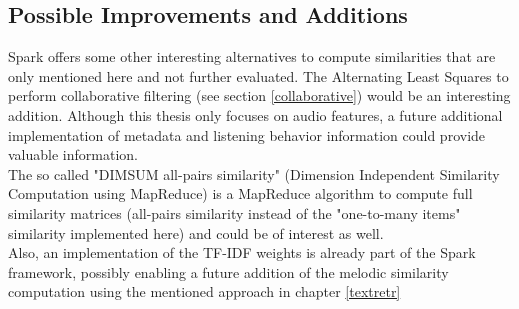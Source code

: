 \subsection{Possible Improvements and Additions}

Spark offers some other interesting alternatives to compute similarities that are only mentioned here and not further evaluated.  
The Alternating Least Squares to perform collaborative filtering (see section \ref{collaborative}) would be an interesting addition. Although this thesis only focuses on audio features, a future additional implementation of metadata and listening behavior information could provide valuable information.\\ 
The so called "DIMSUM all-pairs similarity" (Dimension Independent Similarity Computation using MapReduce) is a MapReduce algorithm to compute full similarity matrices (all-pairs similarity instead of the "one-to-many items" similarity implemented here) and could be of interest as well.\\
Also, an implementation of the TF-IDF weights is already part of the Spark framework, possibly enabling a future addition of the melodic similarity computation using the mentioned approach in chapter \ref{textretr}
